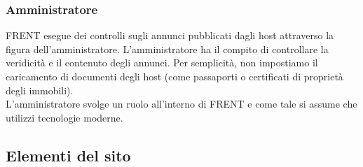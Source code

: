 \documentclass[1_relazione.tex]{subfiles}
\begin{document}
\subsubsection{Amministratore}
FRENT esegue dei controlli sugli annunci pubblicati dagli host attraverso la figura dell'amministratore. L'amministratore ha il compito di controllare la veridicit\`{a} e il contenuto degli annunci.  Per semplicit\`{a}, non impostiamo il caricamento di documenti degli host (come passaporti o certificati di propriet\`{a} degli immobili). \\
L'amministratore svolge un ruolo all'interno di FRENT e come tale si assume che utilizzi tecnologie moderne.   

\subsection{Elementi del sito}
\end{document}
